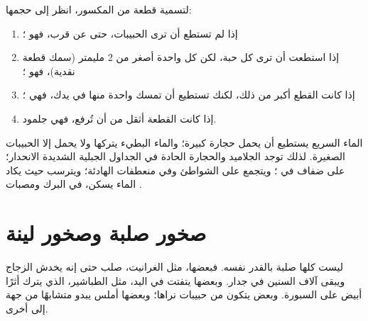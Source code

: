 \begin{method}\label{met:g3:stones-pebbles-sand:sort}
لتسمية قطعة من  المكسور، انظر إلى حجمها:
\begin{enumerate}
  \item إذا لم تستطع أن ترى الحبيبات، حتى عن قرب، فهو ؛
  \item إذا استطعت أن ترى كل حبة، لكن كل واحدة أصغر من 2
        مليمتر (سمك قطعة نقدية)، فهو ؛
  \item إذا كانت القطع أكبر من ذلك، لكنك تستطيع أن تمسك واحدة منها في
        يدك، فهي  ؛
  \item إذا كانت القطعة أثقل من أن تُرفع، فهي جلمود.
\end{enumerate}
\end{method}

\begin{example}\label{ex:g3:stones-pebbles-sand:where}
الماء السريع يستطيع أن يحمل حجارة كبيرة؛ والماء البطيء يتركها ولا يحمل إلا
الحبيبات الصغيرة. لذلك توجد الجلاميد والحجارة الحادة في الجداول الجبلية
الشديدة الانحدار؛   على ضفاف  في ؛ ويتجمع 
على الشواطئ وفي منعطفات  الهادئة؛ ويترسب  حيث يكاد الماء يسكن،
في البرك  ومصبات .
\end{example}

\section{صخور صلبة وصخور لينة}

ليست  كلها صلبة بالقدر نفسه. فبعضها، مثل الغرانيت، صلب حتى إنه يخدش
الزجاج ويبقى آلاف السنين في جدار. وبعضها يتفتت في اليد، مثل الطباشير، الذي
يترك أثرًا أبيض على السبورة. وبعض  يتكون من حبيبات نراها؛ وبعضها
أملس يبدو متشابهًا من جهة إلى أخرى.

